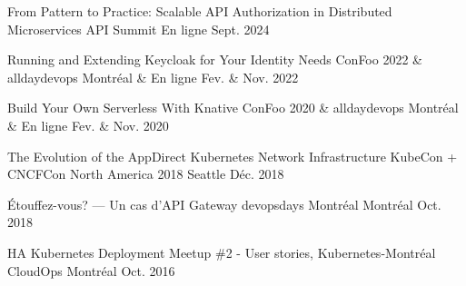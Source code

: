 \begin{cvhonors}

  \cvhonor
    {From Pattern to Practice: Scalable API Authorization in Distributed Microservices} %
    {API Summit} %
    {
    } %
    {En ligne} %
    {Sept. 2024} %

  \cvhonor
    {Running and Extending Keycloak for Your Identity Needs} %
    {ConFoo 2022 \& alldaydevops} %
    {} %
    {Montréal \& En ligne} %
    {Fev. \& Nov. 2022} %

  \cvhonor
    {Build Your Own Serverless With Knative} %
    {ConFoo 2020 \& alldaydevops} %
    {} %
    {Montréal \& En ligne} %
    {Fev. \& Nov. 2020} %



  \cvhonor
    {The Evolution of the AppDirect Kubernetes Network Infrastructure} %
    {KubeCon + CNCFCon North America 2018} %
    {} %
    {Seattle} %
    {Déc. 2018} %

  \cvhonor
    {Étouffez-vous? — Un cas d’API Gateway} %
    {devopsdays Montréal} %
    {} %
    {Montréal} %
    {Oct. 2018} %


  \cvhonor
    {HA Kubernetes Deployment} %
    {Meetup \#2 - User stories, Kubernetes-Montréal} %
    {} %
    {CloudOps Montréal} %
    {Oct. 2016} %

\end{cvhonors}